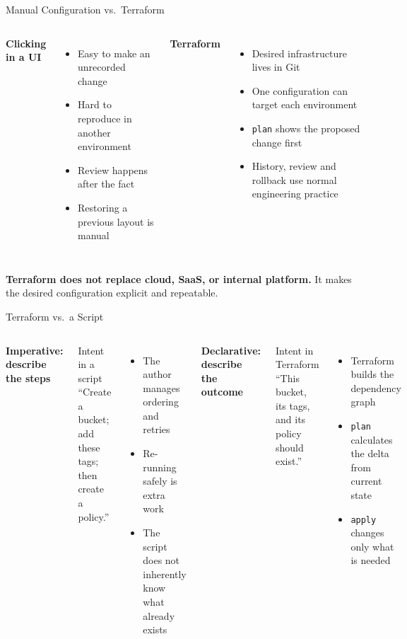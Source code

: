 \documentclass[aspectratio=169, xcolor=table]{beamer}
\begin{document}
\begin{frame}{Manual Configuration vs.\ Terraform}
  \begin{columns}[T]
    \textbf{Clicking in a UI}
    \begin{itemize}
      \item Easy to make an unrecorded change
      \item Hard to reproduce in another environment
      \item Review happens after the fact
      \item Restoring a previous layout is manual
    \end{itemize}

    \textbf{Terraform}
    \begin{itemize}
      \item Desired infrastructure lives in Git
      \item One configuration can target each environment
      \item \texttt{plan} shows the proposed change first
      \item History, review and rollback use normal engineering practice
    \end{itemize}
  \end{columns}

  \vspace{1em}
  \textcolor{SecondaryAccent}{\textbf{Terraform does not replace cloud, SaaS, or internal platform.}}
  It makes the desired configuration explicit and repeatable.
\end{frame}

\begin{frame}{Terraform vs.\ a Script}
  \begin{columns}[T]
    \textbf{Imperative: describe the steps}
    \begin{block}{Intent in a script}
      ``Create a bucket; add these tags; then create a policy.''
    \end{block}
    \begin{itemize}
      \item The author manages ordering and retries
      \item Re-running safely is extra work
      \item The script does not inherently know what already exists
    \end{itemize}

    \textbf{Declarative: describe the outcome}
    \begin{block}{Intent in Terraform}
      ``This bucket, its tags, and its policy should exist.''
    \end{block}
    \begin{itemize}
      \item Terraform builds the dependency graph
      \item \texttt{plan} calculates the delta from current state
      \item \texttt{apply} changes only what is needed
    \end{itemize}
  \end{columns}
\end{frame}
\end{document}
